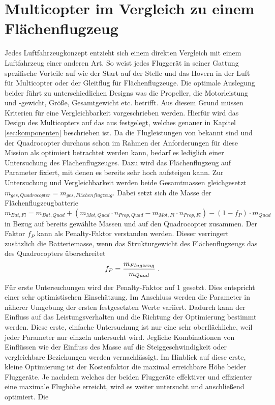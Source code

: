 \section{Multicopter im Vergleich zu einem Flächenflugzeug}
\label{sec:multicopter_vs_flaechenflugzeug}
Jedes Luftfahrzeugkonzept entzieht sich einem direkten Vergleich mit einem Luftfahrzeug einer anderen Art. So weist jedes Fluggerät in seiner Gattung spezifische Vorteile auf wie der Start auf der Stelle und das Hovern in der Luft für Multicopter oder der Gleitflug für Flächenflugzeuge. Die optimale Auslegung beider führt zu unterschiedlichen Designs was die Propeller, die Motorleistung und -gewicht, Größe, Gesamtgewicht etc. betrifft. Aus diesem Grund müssen Kriterien für eine Vergleichbarkeit vorgeschrieben werden. Hierfür wird das Design des Multicopters auf das aus \cite{Anderson.2018} festgelegt, welches genauer in Kapitel \ref{sec:komponenten} beschrieben ist. Da die Flugleistungen von \cite{Anderson.2018} bekannt sind und der Quadrocopter durchaus schon im Rahmen der Anforderungen für diese Mission als optimiert betrachtet werden kann, bedarf es lediglich einer Untersuchung des Flächenflugzeuges. Dazu wird das Flächenflugzeug auf Parameter fixiert, mit denen es bereits sehr hoch aufsteigen kann. Zur Untersuchung und Vergleichbarkeit werden beide Gesamtmassen gleichgesetzt \ensuremath{m_{ges,Quadrocopter} = m_{ges,Flächenflugzeug}}. Dabei setzt sich die Masse der Flächenflugzeugbatterie   
\begin{equation}
	m_{Bat,Fl} = m_{Bat,Quad} + (m_{Mot,Quad}\cdot n_{Prop,Quad} - m_{Mot,Fl}\cdot n_{Prop,Fl}) - (1-f_P)\cdot m_{Quad}  
\end{equation}
in Bezug auf bereits gewählte Massen und auf den Quadrocopter zusammen. Der Faktor \ensuremath{f_P} kann als Penalty-Faktor verstanden werden. Dieser verringert zusätzlich die Batteriemasse, wenn das Strukturgewicht des Flächenflugzeugs das des Quadrocopters überschreitet
\begin{equation}
	f_P = \frac{m_{Flugzeug}}{m_{Quad}} ~\text{.}
	\label{eq:penalty}
\end{equation} 
Für erste Untersuchungen wird der Penalty-Faktor auf 1 gesetzt. Dies entspricht einer sehr optimistischen Einschätzung. Im Anschluss werden die Parameter in näherer Umgebung der ersten festgesetzten Werte variiert. Dadurch kann der Einfluss auf das Leistungsverhalten und die Richtung der Optimierung bestimmt werden. Diese erste, einfache Untersuchung ist nur eine sehr oberflächliche, weil jeder Parameter nur einzeln untersucht wird. Jegliche Kombinationen von Einflüssen wie der Einfluss des Masse auf die Steiggeschwindigkeit oder vergleichbare Beziehungen werden vernachlässigt. Im Hinblick auf diese erste, kleine Optimierung ist der Kostenfaktor die maximal erreichbare Höhe beider Fluggeräte. Je nachdem welches der beiden Fluggeräte effektiver und effizienter eine maximale Flughöhe erreicht, wird es weiter untersucht und anschließend optimiert. Die 


